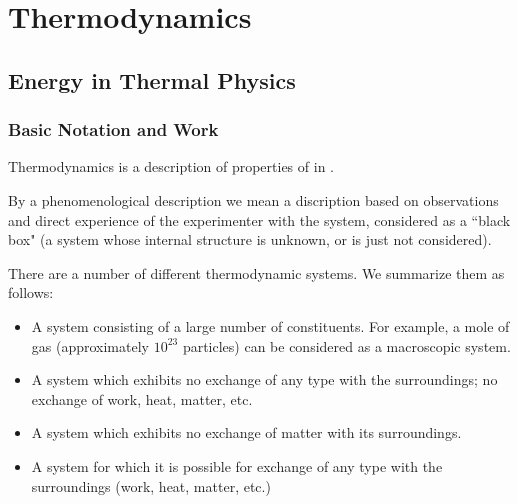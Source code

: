 \documentclass[12pt, a4paper, oneside, openright, titlepage]{book}
\begin{document}
\tableofcontents



\part{Thermodynamics}

\chapter{Energy in Thermal Physics}

\section{Basic Notation and Work}

\begin{defn}
    Thermodynamics is a  description of properties of  in .
\end{defn}

By a phenomenological description we mean a discription based on observations and direct experience of the experimenter with the system, considered as a ``black box" (a system whose internal structure is unknown, or is just not considered).

\begin{defn}[Systems]
    There are a number of different thermodynamic systems. We summarize them as follows: \begin{itemize}
        \item {} A system consisting of a large number of constituents. For example, a mole of gas (approximately $10^{23}$ particles) can be considered as a macroscopic system.
        \item {} A system which exhibits no exchange of any type with the surroundings; no exchange of work, heat, matter, etc.
        \item {} A system which exhibits no exchange of matter with its surroundings.
        \item {} A system for which it is possible for exchange of any type with the surroundings (work, heat, matter, etc.)
    \end{itemize}
\end{defn}
\end{document}
